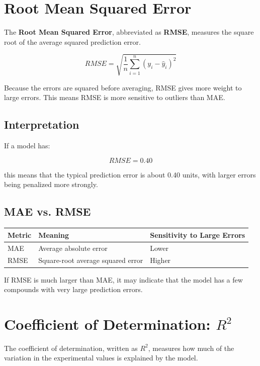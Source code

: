 \documentclass[11pt]{report}
\newenvironment{Important note}{\begin{quote}\color{red}\textbf{Important note:} }{\end{quote}}
\begin{document}
\section{Root Mean Squared Error}

The \textbf{Root Mean Squared Error}, abbreviated as \textbf{RMSE}, measures the square root of the average squared prediction error.

\[
RMSE = \sqrt{\frac{1}{n}\sum_{i=1}^{n}(y_i - \hat{y}_i)^2}
\]

Because the errors are squared before averaging, RMSE gives more weight to large errors. This means RMSE is more sensitive to outliers than MAE.

\subsection*{Interpretation}

If a model has:

\[
RMSE = 0.40
\]

this means that the typical prediction error is about 0.40 units, with larger errors being penalized more strongly.

\subsection*{MAE vs. RMSE}

\begin{center}
\begin{tabular}{lll}
\toprule
\textbf{Metric} & \textbf{Meaning} & \textbf{Sensitivity to Large Errors} \\
\midrule
MAE & Average absolute error & Lower \\
RMSE & Square-root average squared error & Higher \\
\bottomrule
\end{tabular}
\end{center}

If RMSE is much larger than MAE, it may indicate that the model has a few compounds with very large prediction errors.

\section{Coefficient of Determination: $R^2$}

The coefficient of determination, written as $R^2$, measures how much of the variation in the experimental values is explained by the model.
\end{document}
